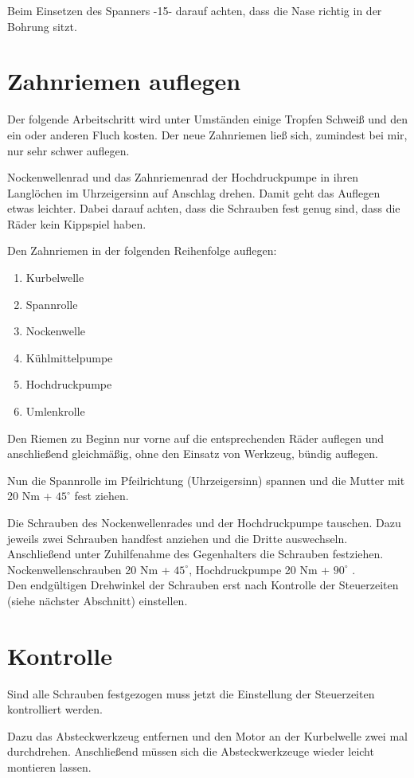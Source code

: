 \documentclass[twoside,a4paper]{refart}
\begin{document}
Beim Einsetzen des Spanners -15- darauf achten, dass die Nase richtig in der Bohrung sitzt.

\section{Zahnriemen auflegen}
Der folgende Arbeitschritt wird unter Umständen einige Tropfen Schweiß und den ein oder anderen Fluch kosten. Der neue Zahnriemen ließ sich, zumindest bei mir, nur sehr schwer auflegen.

Nockenwellenrad und das Zahnriemenrad der Hochdruckpumpe in ihren Langlöchen im Uhrzeigersinn auf Anschlag drehen. Damit geht das Auflegen etwas leichter. Dabei darauf achten, dass die Schrauben fest genug sind, dass die Räder kein Kippspiel haben.

Den Zahnriemen in der folgenden Reihenfolge auflegen:
\begin{enumerate}
	\item Kurbelwelle
	\item Spannrolle
	\item Nockenwelle
	\item Kühlmittelpumpe
	\item Hochdruckpumpe
	\item Umlenkrolle
\end{enumerate}
Den Riemen zu Beginn nur vorne auf die entsprechenden Räder auflegen und anschließend gleichmäßig, ohne den Einsatz von Werkzeug, bündig auflegen.

Nun die Spannrolle im Pfeilrichtung (Uhrzeigersinn) spannen und die Mutter mit 20 Nm +  $45^\circ$ fest ziehen.

Die Schrauben des Nockenwellenrades und der Hochdruckpumpe tauschen. Dazu jeweils zwei Schrauben handfest anziehen und die Dritte auswechseln. Anschließend unter Zuhilfenahme des Gegenhalters die Schrauben festziehen. Nockenwellenschrauben 20 Nm +  $45^\circ$, Hochdruckpumpe 20 Nm +  $90^\circ$ .\\
Den endgültigen Drehwinkel der Schrauben erst nach Kontrolle der Steuerzeiten (siehe nächster Abschnitt) einstellen.
\section{Kontrolle}
Sind alle Schrauben festgezogen muss jetzt die Einstellung der Steuerzeiten kontrolliert werden.

Dazu das Absteckwerkzeug entfernen und den Motor an der Kurbelwelle zwei mal durchdrehen. Anschließend müssen sich die Absteckwerkzeuge wieder leicht montieren lassen.
\end{document}
